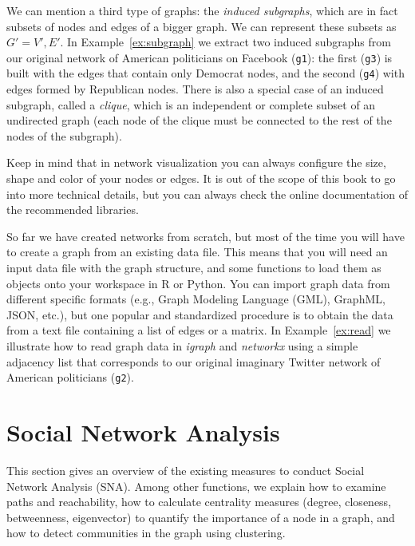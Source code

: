 We can  mention a third type of graphs: the \textit{induced subgraphs}, which are in fact subsets of nodes and edges of a bigger graph. We can represent these subsets as $G' = V', E'$. In Example~\ref{ex:subgraph} we extract two induced subgraphs from our original network of American politicians on Facebook (\texttt{g1}): the first (\texttt{g3}) is built with the edges that contain only Democrat nodes, and the second (\texttt{g4}) with edges formed by Republican nodes. There is also a special case of an induced subgraph, called a \textit{clique}, which is an independent or complete subset of an undirected graph (each node of the clique must be connected to the rest of the nodes of the subgraph).


Keep in mind that in network visualization you can always configure the size, shape and color of your nodes or edges. It is out of the scope of this book to go into more technical details, but you can always check the online documentation of the recommended libraries.

So far we have created networks from scratch, but most of the time you will have to create a graph from an existing data file. This means that you will need an input data file with the graph structure, and some functions to load them as objects onto your workspace in R or Python. You can import graph data from different specific formats (e.g., Graph Modeling Language (GML), GraphML, JSON, etc.), but one popular and standardized procedure is to obtain the data from a text file containing a list of edges or a matrix. In Example~\ref{ex:read}  we illustrate how to read graph data in \emph{igraph} and \emph{networkx} using a simple adjacency list that corresponds to our original imaginary Twitter network of American politicians (\texttt{g2}).


%

\section{Social Network Analysis}
\label{sec:sna}

This section gives an overview of the existing measures to conduct Social Network Analysis (SNA). Among other functions, we explain how to examine paths and reachability, how to calculate centrality measures (degree, closeness, betweenness, eigenvector) to quantify the importance of a node in a graph, and how to detect communities in the graph using clustering.

